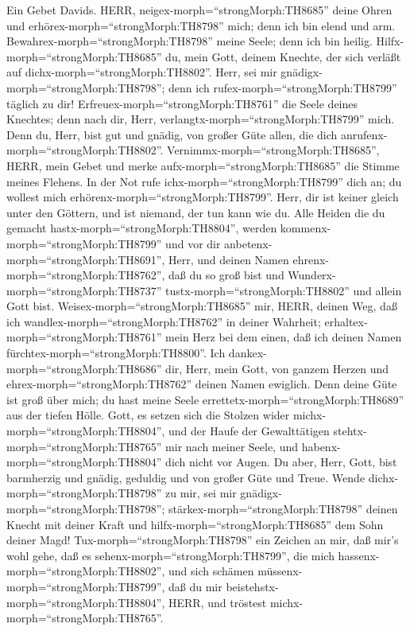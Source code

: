 Ein Gebet Davids. HERR, neigex-morph=``strongMorph:TH8685''
deine Ohren und erhörex-morph=``strongMorph:TH8798'' mich; denn ich bin
elend und arm.  Bewahrex-morph=``strongMorph:TH8798'' meine
Seele; denn ich bin heilig. Hilfx-morph=``strongMorph:TH8685'' du, mein
Gott, deinem Knechte, der sich verläßt auf
dichx-morph=``strongMorph:TH8802''.  Herr, sei mir
gnädigx-morph=``strongMorph:TH8798''; denn ich
rufex-morph=``strongMorph:TH8799'' täglich zu dir! 
Erfreuex-morph=``strongMorph:TH8761'' die Seele deines Knechtes; denn
nach dir, Herr, verlangtx-morph=``strongMorph:TH8799'' mich.
 Denn du, Herr, bist gut und gnädig, von großer Güte allen,
die dich anrufenx-morph=``strongMorph:TH8802''. 
Vernimmx-morph=``strongMorph:TH8685'', HERR, mein Gebet und merke
aufx-morph=``strongMorph:TH8685'' die Stimme meines Flehens.
 In der Not rufe ichx-morph=``strongMorph:TH8799'' dich an;
du wollest mich erhörenx-morph=``strongMorph:TH8799''. 
Herr, dir ist keiner gleich unter den Göttern, und ist niemand, der tun
kann wie du.  Alle Heiden die du gemacht
hastx-morph=``strongMorph:TH8804'', werden
kommenx-morph=``strongMorph:TH8799'' und vor dir
anbetenx-morph=``strongMorph:TH8691'', Herr, und deinen Namen
ehrenx-morph=``strongMorph:TH8762'',  daß du so groß bist
und Wunderx-morph=``strongMorph:TH8737''
tustx-morph=``strongMorph:TH8802'' und allein Gott bist. 
Weisex-morph=``strongMorph:TH8685'' mir, HERR, deinen Weg, daß ich
wandlex-morph=``strongMorph:TH8762'' in deiner Wahrheit;
erhaltex-morph=``strongMorph:TH8761'' mein Herz bei dem einen, daß ich
deinen Namen fürchtex-morph=``strongMorph:TH8800''.  Ich
dankex-morph=``strongMorph:TH8686'' dir, Herr, mein Gott, von ganzem
Herzen und ehrex-morph=``strongMorph:TH8762'' deinen Namen ewiglich.
 Denn deine Güte ist groß über mich; du hast meine Seele
errettetx-morph=``strongMorph:TH8689'' aus der tiefen Hölle.
 Gott, es setzen sich die Stolzen wider
michx-morph=``strongMorph:TH8804'', und der Haufe der Gewalttätigen
stehtx-morph=``strongMorph:TH8765'' mir nach meiner Seele, und
habenx-morph=``strongMorph:TH8804'' dich nicht vor Augen. 
Du aber, Herr, Gott, bist barmherzig und gnädig, geduldig und von großer
Güte und Treue.  Wende dichx-morph=``strongMorph:TH8798''
zu mir, sei mir gnädigx-morph=``strongMorph:TH8798'';
stärkex-morph=``strongMorph:TH8798'' deinen Knecht mit deiner Kraft und
hilfx-morph=``strongMorph:TH8685'' dem Sohn deiner Magd! 
Tux-morph=``strongMorph:TH8798'' ein Zeichen an mir, daß mir's wohl
gehe, daß es sehenx-morph=``strongMorph:TH8799'', die mich
hassenx-morph=``strongMorph:TH8802'', und sich schämen
müssenx-morph=``strongMorph:TH8799'', daß du mir
beistehstx-morph=``strongMorph:TH8804'', HERR, und tröstest
michx-morph=``strongMorph:TH8765''.

